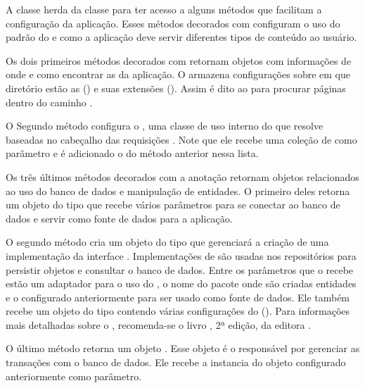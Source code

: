 A classe  herda da classe  para ter acesso a alguns métodos que facilitam a configuração da aplicação. Esses métodos decorados com  configuram o uso do  padrão do  e como a aplicação deve servir diferentes tipos de conteúdo ao usuário.

Os dois primeiros métodos decorados com  retornam objetos com informações de onde e como encontrar as  da aplicação. O  armazena configurações sobre em que diretório estão as  () e suas extensões (). Assim é dito ao  para procurar páginas  dentro do caminho .

O Segundo método configura o , uma classe de uso interno do  que resolve  baseadas no cabeçalho das requisições . Note que ele recebe uma coleção de  como parâmetro e é adicionado o  do método anterior nessa lista.

Os três últimos métodos decorados com a anotação  retornam objetos relacionados ao uso do banco de dados e manipulação de entidades. O primeiro deles retorna um objeto do tipo  que recebe vários parâmetros para se conectar ao banco de dados e servir como fonte de dados para a aplicação. 

O segundo método cria um objeto do tipo  que gerenciará a criação de uma implementação da interface . Implementações de  são usadas nos repositórios para persistir objetos e consultar o banco de dados. Entre os parâmetros que o  recebe estão um adaptador para o uso do , o nome do pacote onde são criadas entidades e o  configurado anteriormente para ser usado como fonte de dados. Ele também recebe um objeto do tipo  contendo várias configurações do  (). Para informações mais detalhadas sobre o , recomenda-se o livro , 2ª edição, da editora .

O último método retorna um objeto . Esse objeto é o responsável por gerenciar as transações com o banco de dados. Ele recebe a instancia do objeto  configurado anteriormente como parâmetro.

